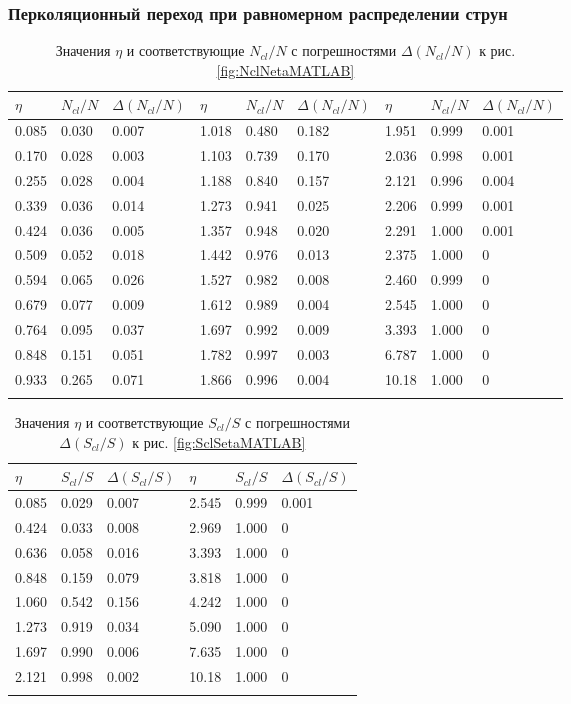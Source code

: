 \subsubsection{Перколяционный переход при равномерном распределении струн}
{\scriptsize
\begin{longtable}{| l | l | l || l | l | l || l | l | l |}
	\hline
	$\eta$	&	$N_{cl}/N$	&	$\Delta (N_{cl}/N)$	&	$\eta$	&	$N_{cl}/N$	&	$\Delta (N_{cl}/N)$	&	$\eta$	&	$N_{cl}/N$	&	$\Delta (N_{cl}/N)$	\\
	\hline
	0.085	&	0.030	&	0.007	&	1.018	&	0.480	&	0.182	&	1.951	&	0.999	&	0.001	\\
	0.170	&	0.028	&	0.003	&	1.103	&	0.739	&	0.170	&	2.036	&	0.998	&	0.001	\\
	0.255	&	0.028	&	0.004	&	1.188	&	0.840	&	0.157	&	2.121	&	0.996	&	0.004	\\
	0.339	&	0.036	&	0.014	&	1.273	&	0.941	&	0.025	&	2.206	&	0.999	&	0.001	\\
	0.424	&	0.036	&	0.005	&	1.357	&	0.948	&	0.020	&	2.291	&	1.000	&	0.001	\\
	0.509	&	0.052	&	0.018	&	1.442	&	0.976	&	0.013	&	2.375	&	1.000	&	0	\\
	0.594	&	0.065	&	0.026	&	1.527	&	0.982	&	0.008	&	2.460	&	0.999	&	0	\\
	0.679	&	0.077	&	0.009	&	1.612	&	0.989	&	0.004	&	2.545	&	1.000	&	0	\\
	0.764	&	0.095	&	0.037	&	1.697	&	0.992	&	0.009	&	3.393	&	1.000	&	0	\\
	0.848	&	0.151	&	0.051	&	1.782	&	0.997	&	0.003	&	6.787	&	1.000	&	0	\\
	0.933	&	0.265	&	0.071	&	1.866	&	0.996	&	0.004	&	10.18	&	1.000	&	0	\\
	\hline
	\caption{Значения $\eta$ и соответствующие $N_{cl}/N$ с погрешностями $\Delta (N_{cl}/N)$ к рис. \ref{fig:NclNetaMATLAB}} \label{tab:NclNetaMATLAB}
\end{longtable}}

{\scriptsize
\begin{longtable}{| l | l | l || l | l | l |}
	\hline
	$\eta$	&	$S_{cl}/S$	&	$\Delta (S_{cl}/S)$	&	$\eta$	&	$S_{cl}/S$	&	$\Delta (S_{cl}/S)$	\\
	\hline
	0.085	&	0.029	&	0.007	&	2.545	&	0.999	&	0.001	\\
	0.424	&	0.033	&	0.008	&	2.969	&	1.000	&	0	\\
	0.636	&	0.058	&	0.016	&	3.393	&	1.000	&	0	\\
	0.848	&	0.159	&	0.079	&	3.818	&	1.000	&	0	\\
	1.060	&	0.542	&	0.156	&	4.242	&	1.000	&	0	\\
	1.273	&	0.919	&	0.034	&	5.090	&	1.000	&	0	\\
	1.697	&	0.990	&	0.006	&	7.635	&	1.000	&	0	\\
	2.121	&	0.998	&	0.002	&	10.18	&	1.000	&	0	\\
	\hline
	\caption{Значения $\eta$ и соответствующие $S_{cl}/S$ с погрешностями $\Delta (S_{cl}/S)$ к рис. \ref{fig:SclSetaMATLAB}} \label{tab:SclSetaMATLAB}
\end{longtable}}

